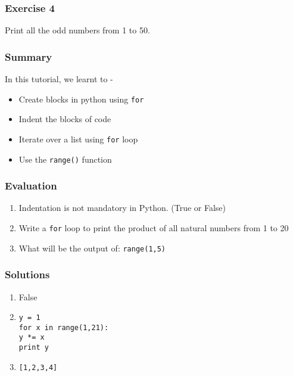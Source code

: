 \documentclass[17pt,compress]{beamer}
\begin{document}
\begin{frame}
\frametitle{Exercise 4}
  Print all the odd numbers from 1 to 50.
\end{frame}
\begin{frame}
\frametitle{Summary}
  In this tutorial, we learnt to -
\begin{itemize}
\item Create blocks in python using \texttt{for}
\item Indent the blocks of code
\item Iterate over a list using \texttt{for} loop
\item Use the \texttt{range()} function
\end{itemize}
\end{frame}
\begin{frame}
\frametitle{Evaluation}
\begin{enumerate}
    \item Indentation is not mandatory in Python. (True or False)\pause
    \vspace{8pt}
    \item Write a \texttt{for} loop to print the product of all natural numbers from 1 to 20\pause
    \vspace{8pt}
    \item What will be the output of: \texttt{range(1,5)}
\end{enumerate}
\end{frame}
\begin{frame}
\frametitle{Solutions}
\begin{enumerate}
    \item False\pause
    \vspace{8pt}
    \item \texttt{y = 1}\\
    \texttt{for x in range(1,21):}\\
    \hspace{12pt}
              \texttt{y *= x}\\
        \texttt{print y} \pause
    \vspace{8pt}      
    \item \texttt{[1,2,3,4]}
\end{enumerate}
\end{frame}
\end{document}
